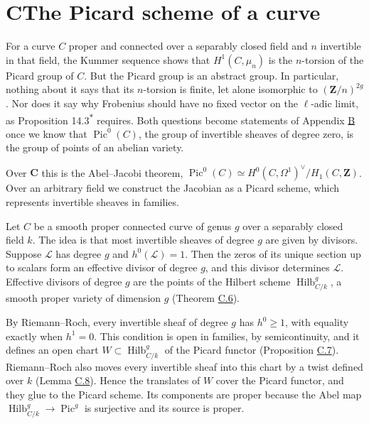 \documentclass[11pt]{article}
\newcommand{\bpout}[1]{#1\textsuperscript{\hyperlink{bp-outside}{\ensuremath{\ast}}}}
\begin{document}
\section*{\texorpdfstring{C\quad The Picard scheme of a curve}{C The Picard scheme of a curve}}
\label{bp119}%
\label{bp120}%
For a curve \(C\) proper and connected over a separably closed field and \(n\) invertible in that field, the Kummer sequence shows that \(H^1(C,\mu_n)\) is the \(n\)-torsion of the Picard group of \(C\). But the Picard group is an abstract group. In particular, nothing about it says that its \(n\)-torsion is finite, let alone isomorphic to \((\mathbf Z/n)^{2g}\). Nor does it say why Frobenius should have no fixed vector on the \(\ell\)-adic limit, as Proposition \bpout{14.3} requires. Both questions become statements of Appendix \hyperref[bp75]{B} once we know that \(\operatorname{Pic}^0(C)\), the group of invertible sheaves of degree zero, is the group of points of an abelian variety.

Over \(\mathbf C\) this is the Abel–Jacobi theorem, \(\operatorname{Pic}^0(C)\simeq
H^0(C,\Omega^1)^\vee/H_1(C,\mathbf Z)\). Over an arbitrary field we construct the Jacobian as a Picard scheme, which represents invertible sheaves in families.

Let \(C\) be a smooth proper connected curve of genus \(g\) over a separably closed field \(k\). The idea is that most invertible sheaves of degree \(g\) are given by divisors. Suppose \(\mathcal L\) has degree \(g\) and \(h^0(\mathcal L)=1\). Then the zeros of its unique section up to scalars form an effective divisor of degree \(g\), and this divisor determines \(\mathcal L\). Effective divisors of degree \(g\) are the points of the Hilbert scheme \(\operatorname{Hilb}^{g}_{C/k}\), a smooth proper variety of dimension \(g\) (Theorem \hyperref[bp139]{C.6}).

By Riemann–Roch, every invertible sheaf of degree \(g\) has \(h^0\geq1\), with equality exactly when \(h^1=0\). This condition is open in families, by semicontinuity, and it defines an open chart \(W\subset\operatorname{Hilb}^{g}_{C/k}\) of the Picard functor (Proposition \hyperref[bp142]{C.7}). Riemann–Roch also moves every invertible sheaf into this chart by a twist defined over \(k\) (Lemma \hyperref[bp145]{C.8}). Hence the translates of \(W\) cover the Picard functor, and they glue to the Picard scheme. Its components are proper because the Abel map \(\operatorname{Hilb}^{g}_{C/k}\to\operatorname{Pic}^g\) is surjective and its source is proper.
\end{document}
